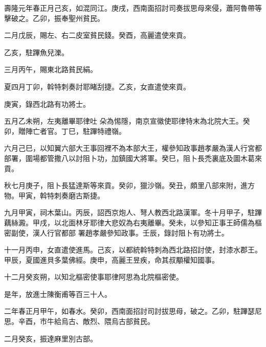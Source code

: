 
\begin{pinyinscope}

 壽隆元年春正月己亥，如混同江。庚戌，西南面招討司奏拔思母來侵，蕭阿魯帶等擊破之。乙卯，振奉聖州貧民。



 二月戊辰，賜左、右二皮室貧民錢。癸酉，高麗遣使來貢。



 乙亥，駐蹕魚兒濼。



 三月丙午，賜東北路貧民絹。



 夏四月丁卯，斡特刺奏討耶睹刮捷。乙亥，女直遣使來貢。



 庚寅，錄西北路有功將士。



 五月乙未朔，左夷離畢耶律吐
 朵為惕隱，南京宣徽使耶律特末為北院大王。癸卯，贈陣亡者官。丁巳，駐蹕特禮嶺。



 六月己巳，以知翼六部大王事回裡不為本部大王，權參知政事趙孝嚴為漢人行宮都部署，圍場都管撒八以討阻卜功，加鎮國大將軍。癸巳，阻卜長禿裏底及圖木葛來貢。



 秋七月庚子，阻卜長猛達斯等來貢。癸卯，獵沙嶺。癸丑，頗里八部來附，進方物。甲寅，斡特刺奏磨古斯捷。



 九月甲寅，祠木葉山。丙辰，詔西京炮人、弩人教西北路漢軍。冬十月甲子，駐蹕藕絲澱。甲戌，以北面林牙耶律大悲奴為右夷離畢。癸未，以參知正事王師儒為樞密副使，漢人行官都部
 署趙孝嚴參知政事。壬辰，錄討阻卜有功將士。



 十一月丙申，女直遣使進馬。己亥，以都統斡特刺為西北路招討使，封漆水郡王。甲辰，夏國進貝多葉佛經。庚申，高麗王昱疾，命其叔顒權知國事。



 十二月癸亥朔，以知北樞密使事耶律阿思為北院樞密使。



 是年，放進士陳衡甫等百三十人。



 二年春正月甲午，如春水。癸卯，西南面招討司討拔思母，破之。乙卯，駐蹕瑟尼思。辛酉，市牛給烏古、敵烈、隈烏古部貧民。



 二月癸亥，振達麻里別古部。




\end{pinyinscope}

